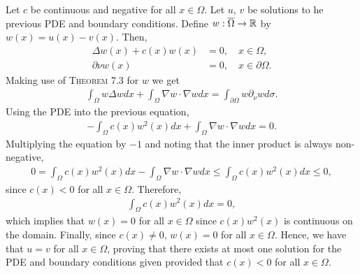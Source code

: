 \begin{questions}
\begin{solution}
Let $c$ be continuous and negative for all $x\in\Omega$. Let $u$, $v$ be solutions to he previous PDE and boundary conditions. Define $w:\overline{\Omega}\rightarrow\mathbb{R}$ by $w(x)=u(x)-v(x)$. Then,
\begin{align*}
\Delta w(x)+c(x)w(x)&=0,\quad x\in\Omega,\\
\partial\nu w(x)&=0,\quad x\in\partial\Omega.
\end{align*}
Making use of \textsc{Theorem 7.3} for $w$ we get
\begin{align*}
\int_{\Omega}w\Delta wdx+\int_{\Omega}\nabla w\cdot\nabla w dx=\int_{\partial\Omega}w\partial_{\nu}w d\sigma.
\end{align*}
Using the PDE into the previous equation,
\begin{align*}
-\int_{\Omega}c(x)w^2(x)dx+\int_{\Omega}\nabla w\cdot\nabla w dx=0.
\end{align*}
Multiplying the equation by $-1$ and noting that the inner product is always non-negative,
\begin{align*}
0=\int_{\Omega}c(x)w^2(x)dx-\int_{\Omega}\nabla w\cdot\nabla w dx\leq\int_{\Omega}c(x)w^2(x)dx\leq 0,
\end{align*}
since $c(x)<0$ for all $x\in\Omega$. Therefore,
\begin{align*}
\int_{\Omega}c(x)w^2(x)dx=0,
\end{align*}
which implies that $w(x)=0$ for all $x\in\Omega$ since $c(x)w^2(x)$ is continuous on the domain. Finally, since $c(x)\neq 0$, $w(x)=0$ for all $x\in\Omega$. Hence, we have that $u=v$ for all $x\in\Omega$, proving that there exists at most one solution for the PDE and boundary conditions given provided that $c(x)<0$ for all $x\in\Omega$.
\end{solution}
\end{questions}